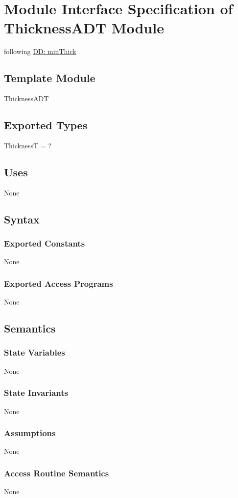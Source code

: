 \documentclass[12pt]{article}
\begin{document}
\section{Module Interface Specification of ThicknessADT Module}
\label{Sec:ThicknessADT}
following \hyperref[DD:minThick]{DD: minThick}
\subsection{Template Module}
\label{Sec:TemplateModule}
ThicknessADT
\subsection{Exported Types}
\label{Sec:ExpTypes}
ThicknessT = ?
\subsection{Uses}
\label{Sec:Uses}
None
\subsection{Syntax}
\label{Sec:Syntax}
\subsubsection{Exported Constants}
\label{Sec:ExpConstants}
None
\subsubsection{Exported Access Programs}
\label{Sec:ExpAccPrograms}
None
\subsection{Semantics}
\label{Sec:Semantics}
\subsubsection{State Variables}
\label{Sec:StateVars}
None
\subsubsection{State Invariants}
\label{Sec:StateInvars}
None
\subsubsection{Assumptions}
\label{Sec:Assumps}
None
\subsubsection{Access Routine Semantics}
\label{Sec:AccRoutSemantics}
None
\end{document}
